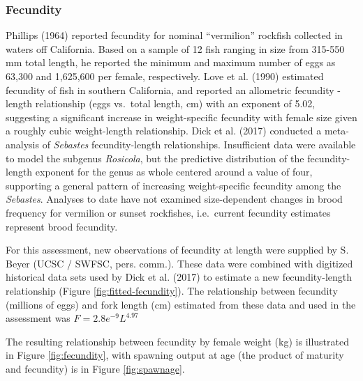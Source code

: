 \documentclass[11pt,
  english,
  a4paper,
]{article}
\begin{document}

\hypertarget{fecundity}{%
\subsubsection{Fecundity}\label{fecundity}}

\leavevmode\tagmcend\tagstructend

Phillips {(1964)\leavevmode\tagmcend\tagstructend} reported fecundity for nominal ``vermilion'' rockfish collected in waters off California. Based on a sample of 12 fish ranging in size from 315-550 mm total length, he reported the minimum and maximum number of eggs as 63,300 and 1,625,600 per female, respectively. Love et al. {(1990)\leavevmode\tagmcend\tagstructend} estimated fecundity of fish in southern California, and reported an allometric fecundity - length relationship (eggs vs.~total length, cm) with an exponent of 5.02, suggesting a significant increase in weight-specific fecundity with female size given a roughly cubic weight-length relationship. Dick et al. {(2017)\leavevmode\tagmcend\tagstructend} conducted a meta-analysis of \emph{Sebastes} fecundity-length relationships. Insufficient data were available to model the subgenus \emph{Rosicola}, but the predictive distribution of the fecundity-length exponent for the genus as whole centered around a value of four, supporting a general pattern of increasing weight-specific fecundity among the \emph{Sebastes}. Analyses to date have not examined size-dependent changes in brood frequency for vermilion or sunset rockfishes, i.e.~current fecundity estimates represent brood fecundity.

For this assessment, new observations of fecundity at length were supplied by S. Beyer (UCSC / SWFSC, pers. comm.). These data were combined with digitized historical data sets used by Dick et al. {(2017)\leavevmode\tagmcend\tagstructend} to estimate a new fecundity-length relationship (Figure \ref{fig:fitted-fecundity}). The relationship between fecundity (millions of eggs) and fork length (cm) estimated from these data and used in the assessment was {\(F = 2.8e^{-9}L^{4.97}\)\leavevmode\tagmcend\tagstructend}

The resulting relationship between fecundity by female weight (kg) is illustrated in Figure \ref{fig:fecundity}, with spawning output at age (the product of maturity and fecundity) is in Figure \ref{fig:spawnage}.
\end{document}
